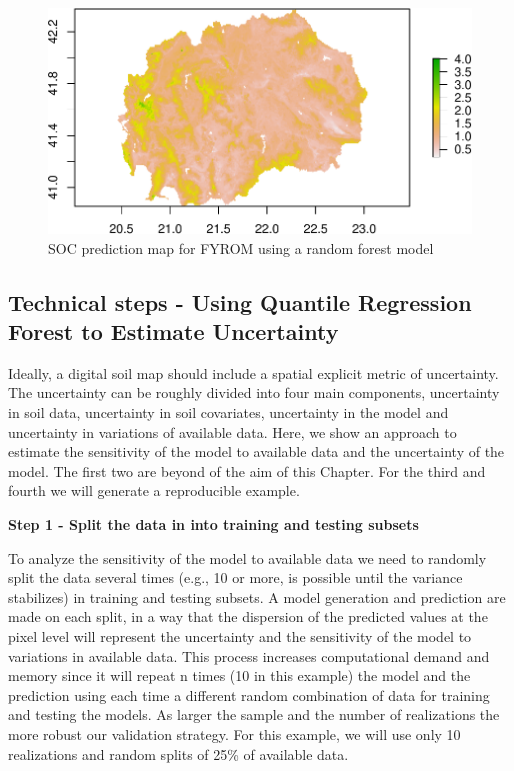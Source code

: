 \documentclass[10pt,b5paper,]{book}
\theoremstyle{definition}
\theoremstyle{definition}
\theoremstyle{definition}
\theoremstyle{remark}
\begin{document}
\begin{figure}
\centering
\includegraphics{SOCMapping_files/figure-latex/rf-pred-1.pdf}
\caption{\label{fig:rf-pred}SOC prediction map for FYROM using a random
forest model}
\end{figure}

\hypertarget{technical-steps---using-quantile-regression-forest-to-estimate-uncertainty}{%
\subsection{Technical steps - Using Quantile Regression Forest to
Estimate
Uncertainty}\label{technical-steps---using-quantile-regression-forest-to-estimate-uncertainty}}

Ideally, a digital soil map should include a spatial explicit metric of
uncertainty. The uncertainty can be roughly divided into four main
components, uncertainty in soil data, uncertainty in soil covariates,
uncertainty in the model and uncertainty in variations of available
data. Here, we show an approach to estimate the sensitivity of the model
to available data and the uncertainty of the model. The first two are
beyond of the aim of this Chapter. For the third and fourth we will
generate a reproducible example.

\textbf{Step 1 - Split the data in into training and testing subsets}

To analyze the sensitivity of the model to available data we need to
randomly split the data several times (e.g., 10 or more, is possible
until the variance stabilizes) in training and testing subsets. A model
generation and prediction are made on each split, in a way that the
dispersion of the predicted values at the pixel level will represent the
uncertainty and the sensitivity of the model to variations in available
data. This process increases computational demand and memory since it
will repeat n times (10 in this example) the model and the prediction
using each time a different random combination of data for training and
testing the models. As larger the sample and the number of realizations
the more robust our validation strategy. For this example, we will use
only 10 realizations and random splits of 25\% of available data.
\end{document}
